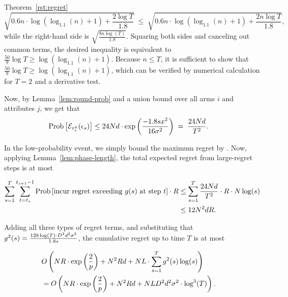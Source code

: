 \begin{extraproof}{Theorem~\ref{rst:regret}}
\[
  \sqrt{0.6 n \cdot \log (\log_{1.1}(n) + 1) + \frac{2 \log T}{1.8}}
  \; \leq \;
  \sqrt{0.6 n \cdot \log (\log_{1.1}(n) + 1) + \frac{2 n \log T}{1.8}},
\]
while the right-hand side is $\sqrt{\frac{8 n \log(T)}{1.8}}$.
Squaring both sides and canceling out common terms,
the desired inequality is equivalent to
$\frac{50}{9} \log T \geq \log(\log_{1.1}(n) + 1)$.
Because $n \leq T$, it is sufficient to show that
$\frac{50}{9} \log T \geq \log(\log_{1.1}(n) + 1)$,
which can be verified by numerical calculation for $T=2$ and a
derivative test.

Now, by Lemma~\ref{lem:round-prob} and a union bound over all arms $i$
and attributes $j$, we get that 
\begin{align*}
\Prob{\AccEU{\tau_s^k}{\epsilon_s}}
& \leq 24 \ARMNUM d \cdot \exp \left( \frac{-1.8 s x^2}{16 \sigma^2} \right)
\; = \; \frac{24 \ARMNUM d}{T^2}.
\end{align*}

In the low-probability event, we simply 
bound the maximum regret by \MAXR.
Now, applying Lemma~\ref{lem:phase-length},
the total expected regret from large-regret steps is at most

\begin{align*}
\sum_{s = 1}^T \sum_{t=t_s}^{t_{s+1}-1}
  \Prob{\mbox{incur regret exceeding } g(s) \mbox{ at step } t} \cdot \MAXR
& \leq
 \sum_{s = 1}^T \frac{24 \ARMNUM d}{T^2} \cdot \MAXR \cdot \ARMNUM \log(s)
\\ & \leq 12 \ARMNUM^2 d \MAXR.
\end{align*}

Adding all three types of regret terms,
and substituting that 
$g^2(s) = \frac{128\log(T) \cdot D^2 d^2 \sigma^2}{1.8 s}$,
the cumulative regret up to time $T$ is at most

\begin{align*}
\lefteqn{
O \left(\ARMNUM \MAXR \cdot \exp \left( \frac{2}{p} \right)
+ \ARMNUM^2 \MAXR d
+ \ARMNUM \TieDensity \cdot \sum_{s=1}^{T} g^2(s) \log(s) \right)}
\\ & = 
O \left(\ARMNUM \MAXR \cdot \exp \left( \frac{2}{p} \right)
+ \ARMNUM^2 \MAXR d
+ \ARMNUM \TieDensity \Diam^2 d^2 \sigma^2 \cdot \log^3(T) \right).
\end{align*}
\end{extraproof}
